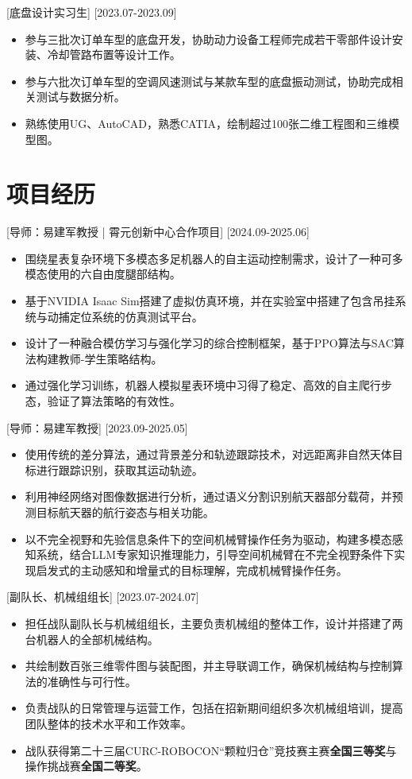 \documentclass{resume}
\begin{document}
[底盘设计实习生]
[2023.07-2023.09]

\begin{itemize}
  \item 参与三批次订单车型的底盘开发，协助动力设备工程师完成若干零部件设计安装、冷却管路布置等设计工作。
  \item 参与六批次订单车型的空调风速测试与某款车型的底盘振动测试，协助完成相关测试与数据分析。 
  \item 熟练使用UG、AutoCAD，熟悉CATIA，绘制超过100张二维工程图和三维模型图。

\end{itemize}

\section{项目经历}

[导师：易建军教授 \textnormal{|} 霄元创新中心合作项目]
[2024.09-2025.06]
\begin{itemize}
  \item 围绕星表复杂环境下多模态多足机器人的自主运动控制需求，设计了一种可多模态使用的六自由度腿部结构。
  \item 基于NVIDIA Isaac Sim搭建了虚拟仿真环境，并在实验室中搭建了包含吊挂系统与动捕定位系统的仿真测试平台。
  \item 设计了一种融合模仿学习与强化学习的综合控制框架，基于PPO算法与SAC算法构建教师-学生策略结构。
  \item 通过强化学习训练，机器人模拟星表环境中习得了稳定、高效的自主爬行步态，验证了算法策略的有效性。
\end{itemize}

[导师：易建军教授]
[2023.09-2025.05]
\begin{itemize}
  \item 使用传统的差分算法，通过背景差分和轨迹跟踪技术，对远距离非自然天体目标进行跟踪识别，获取其运动轨迹。
  \item 利用神经网络对图像数据进行分析，通过语义分割识别航天器部分载荷，并预测目标航天器的航行姿态与相关功能。
  \item 以不完全视野和先验信息条件下的空间机械臂操作任务为驱动，构建多模态感知系统，结合LLM专家知识推理能力，引导空间机械臂在不完全视野条件下实现启发式的主动感知和增量式的目标理解，完成机械臂操作任务。
\end{itemize}

[副队长、机械组组长]
[2023.07-2024.07]
\begin{itemize}
  \item 担任战队副队长与机械组组长，主要负责机械组的整体工作，设计并搭建了两台机器人的全部机械结构。
  \item 共绘制数百张三维零件图与装配图，并主导联调工作，确保机械结构与控制算法的准确性与可行性。
  \item 负责战队的日常管理与运营工作，包括在招新期间组织多次机械组培训，提高团队整体的技术水平和工作效率。
  \item 战队获得第二十三届CURC-ROBOCON“颗粒归仓”竞技赛主赛\textbf{全国三等奖}与操作挑战赛\textbf{全国二等奖}。
\end{itemize}
\end{document}
